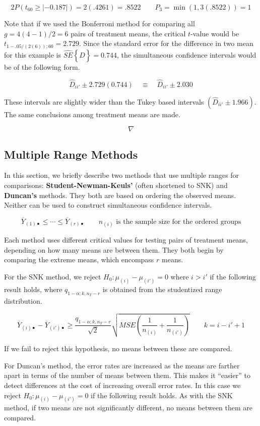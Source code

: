 \documentclass[
]{book}
\begin{document}
\[
2P\left(t_{60}\ge|-0.187|\right) = 2(.4261)=.8522
\qquad
P_3 = \min\left(1,3(.8522)\right) = 1
\]

Note that if we used the Bonferroni method for comparing all
\(g=4(4-1)/2=6\) pairs of treatment means, the critical \(t\)-value
would be \(t_{1-.05/(2(6));60}=2.729\). Since the standard error for the
difference in two mean for this example is
\(\hat{SE}\left\{\hat{D}\right\}=0.744\), the simultaneous confidence
intervals would be of the following form.

\[
\hat{D}_{ii'} \pm 2.729(0.744) \quad \equiv \quad \hat{D}_{ii'} \pm 2.030 
\]

These intervals are slightly wider than the Tukey based intervals
\(\left(\hat{D}_{ii'} \pm 1.966\right)\). The same conclusions among
treatment means are made.

\[\nabla\]

\subsection{Multiple Range Methods}\label{multiple-range-methods}

In this section, we briefly describe two methods that use multiple
ranges for comparisons: \textbf{Student-Newman-Keuls'} (often shortened
to SNK) and \textbf{Duncan's} methods. They both are based on ordering
the observed means. Neither can be used to construct simultaneous
confidence intervals.

\[
\overline{Y}_{(1)\bullet} \le \cdots \le \overline{Y}_{(r)\bullet} \qquad n_{(i)} \mbox{ is the sample size for the ordered groups}
\]

Each method uses different critical values for testing pairs of
treatment means, depending on how many means are between them. They both
begin by comparing the extreme means, which encompass \(r\) means.

For the SNK method, we reject \(H_0:\mu_{(i)}-\mu_{(i')}=0\) where
\(i>i'\) if the following result holds, where \(q_{1-\alpha;k,n_T-r}\)
is obtained from the studentized range distribution.

\[
\overline{Y}_{(i)\bullet}- \overline{Y}_{(i')\bullet} \ge
\frac{q_{1-\alpha;k,n_T-r}}{\sqrt{2}}
\sqrt{MSE\left(\frac{1}{n_{(i)}}+\frac{1}{n_{(i')}}\right)} \qquad k=i-i'+1
\]

If we fail to reject this hypothesis, no means between these are
compared.

For Duncan's method, the error rates are increased as the means are
farther apart in terms of the number of means between them. This makes
it ``easier'' to detect differences at the cost of increasing overall
error rates. In this case we reject \(H_0:\mu_{(i)}-\mu_{(i')}=0\) if
the following result holds. As with the SNK method, if two means are not
significantly different, no means between them are compared.
\end{document}
